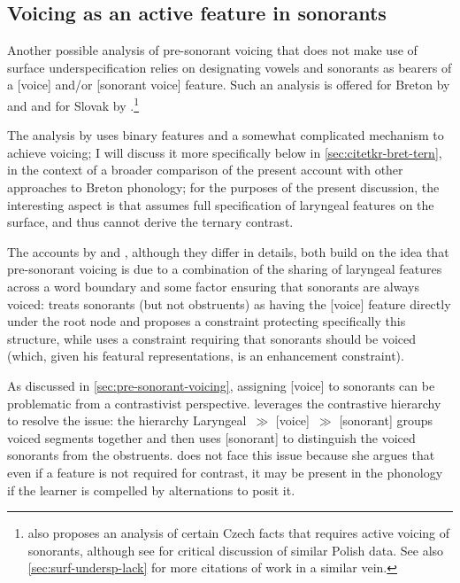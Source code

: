 \subsection{Voicing as an active feature in sonorants}
\label{sec:voicing-as-an}

Another possible analysis of pre\hyp sonorant voicing that does not make use of surface underspecification relies on designating vowels and sonorants as bearers of a [voice] and/or [sonorant voice] feature. Such an analysis is offered for Breton by \citet{kramer-breton} and \citet{hall09:_laryn_breton} and for Slovak by \citet{blaho-diss}.\footnote{\citet{currie07} also proposes an analysis of certain Czech facts that requires active voicing of sonorants, although see \citet{strycharczuk12:_sonor_polis} for critical discussion of similar Polish data. See also \cref{sec:surf-undersp-lack} for more citations of work in a similar vein.}

The analysis by \citet{kramer-breton} uses binary features and a somewhat complicated mechanism to achieve voicing; I will discuss it more specifically below in \cref{sec:citetkr-bret-tern}, in the context of a broader comparison of the present account with other approaches to Breton phonology; for the purposes of the present discussion, the interesting aspect is that \citet{kramer-breton} assumes full specification of laryngeal features on the surface, and thus cannot derive the ternary contrast.

The accounts by \citet{blaho-diss} and \citet{hall09:_laryn_breton}, although they differ in details, both build on the idea that pre\hyp sonorant voicing is due to a combination of the sharing of laryngeal features across a word boundary and some factor ensuring that sonorants are always voiced: \citet{blaho-diss} treats sonorants (but not obstruents) as having the [voice] feature directly under the root node and proposes a constraint protecting specifically this structure, while \citet{hall09:_laryn_breton} uses a constraint requiring that sonorants should be voiced (which, given his featural representations, is an enhancement constraint).

As discussed in \cref{sec:pre-sonorant-voicing}, assigning [voice] to sonorants can be problematic from a contrastivist perspective. \citet{hall09:_laryn_breton} leverages the contrastive hierarchy to resolve the issue: the hierarchy Laryngeal~$\gg$ [voice]~$\gg$ [sonorant] groups voiced segments together and then uses [sonorant] to distinguish the voiced sonorants from the obstruents. \citet{blaho-diss} does not face this issue because she argues that even if a feature is not required for contrast, it may be present in the phonology if the learner is compelled by alternations to posit it.

